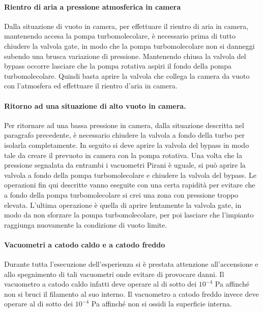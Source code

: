 \paragraph{Rientro di aria a pressione atmosferica in camera\\}
Dalla situazione di vuoto in camera, per effettuare il rientro di aria in camera, mantenendo accesa la pompa turbomolecolare, è necessario prima di tutto chiudere la valvola gate, in modo che la pompa turbomolecolare non si danneggi subendo una brusca variazione di pressione. Mantenendo chiusa la valvola del bypass occorre lasciare che la pompa rotativa aspiri il fondo della pompa turbomolecolare. Quindi basta aprire la valvola che collega la camera da vuoto con l'atmosfera ed effettuare il rientro d'aria in camera.
\paragraph{Ritorno ad una situazione di alto vuoto in camera.\\}
Per ritornare ad una bassa pressione in camera, dalla situazione descritta nel paragrafo precedente, è necessario chiudere la valvola a fondo della turbo per isolarla completamente. In seguito si deve aprire la valvola del bypass in modo tale da creare il prevuoto in camera con la pompa rotativa. Una volta che la pressione segnalata da entrambi i vacuometri Pirani è uguale, si può aprire la valvola a fondo della pompa turbomolecolare e chiudere la valvola del bypass. Le operazioni fin qui descritte vanno eseguite con una certa rapidità per evitare che a fondo della pompa turbomolecolare si crei una zona con pressione troppo elevata. L'ultima operazione è quella di aprire lentamente la valvola gate, in modo da non sforzare la pompa turbomolecolare, per poi lasciare che l'impianto raggiunga nuovamente la condizione di vuoto limite.
\paragraph{Vacuometri a catodo caldo e a catodo freddo\\}
Durante tutta l'esecuzione dell'esperienza si è prestata attenzione all'accensione e allo spegnimento di tali vacuometri onde evitare di provocare danni. Il vacuometro a catodo caldo infatti deve operare al di sotto dei $10^{-4}$ \si{\pascal} affinché non si bruci il filamento al suo interno. Il vacuometro a catodo freddo invece deve operare al di sotto dei $10^{-4}$ \si{\pascal} affinché non si ossidi la superficie interna.

